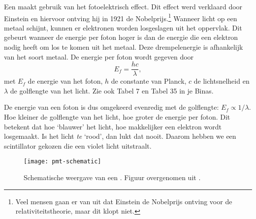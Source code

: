 Een \pmt maakt gebruik van het fotoelektrisch effect.  Dit effect werd
verklaard door Einstein en hiervoor ontving hij in 1921 de
Nobelprijs.\footnote{Veel mensen gaan er van uit dat Einstein de Nobelprijs
ontving voor de relativiteitstheorie, maar dit klopt niet.}  Wanneer licht
op een metaal schijnt, kunnen er elektronen worden losgeslagen uit het
oppervlak.  Dit gebeurt wanneer de energie per foton hoger is dan de
energie die een elektron nodig heeft om los te komen uit het metaal.  Deze
drempelenergie is afhankelijk van het soort metaal.  De energie per foton
wordt gegeven door
\begin{equation}
E_f = \frac{hc}{\lambda},
\end{equation}
met $E_f$ de energie van het foton, $h$ de constante van Planck, $c$ de
lichtsnelheid en $\lambda$ de golflengte van het licht.  Zie ook Tabel 7
en Tabel 35 in je Binas.

De energie van een foton is dus omgekeerd evenredig met de golflengte:
$E_f \propto 1/\lambda$.  Hoe kleiner de golflengte van het licht, hoe
groter de energie per foton.  Dit betekent dat hoe `blauwer' het licht,
hoe makkelijker een elektron wordt losgemaakt.  Is het licht \emph{te}
`rood', dan lukt dat nooit.  Daarom hebben we een scintillator gekozen die
een violet licht uitstraalt.

\begin{figure}
\centering
\texttt{[image: pmt-schematic]}
\caption{Schematische weergave van een \pmt.  Figuur overgenomen uit
\cite{hamamatsu}.}
\label{fig:pmt}
\end{figure}


